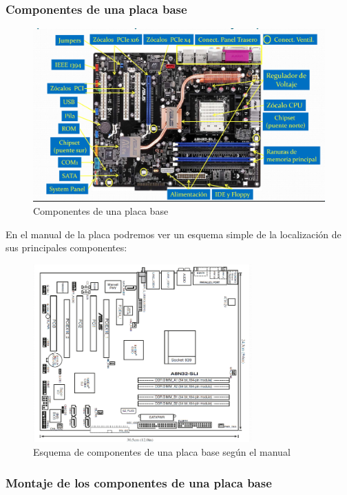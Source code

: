 \documentclass[12pt,spanish]{article}
\begin{document}
\subsubsection{Componentes de una placa base}
\begin{figure}[H]
	\centering
	\includegraphics[width=\textwidth]{mobocomponents.png}
	\caption{Componentes de una placa base}
\end{figure}
En el manual de la placa podremos ver un esquema simple de la localización de sus principales componentes:

\begin{figure}[H]
	\centering
	\includegraphics[width=0.75\textwidth]{mobocomponentsmanual.png}
	\caption{Esquema de componentes de una placa base según el manual}
\end{figure}

\subsubsection{Montaje de los componentes de una placa base}
\end{document}
